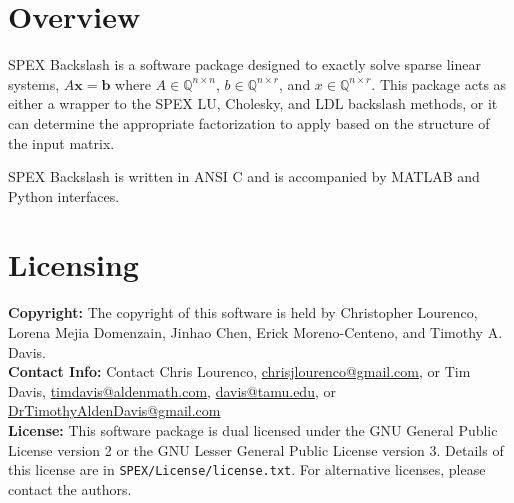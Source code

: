 \documentclass[12pt,oneside]{book}
\theoremstyle{definition}
\renewcommand{\b}{\mathbf{b}}
\newcommand{\x}{\mathbf{x}}
\begin{document}
\section{Overview} \label{s:Backslash:intro}
SPEX Backslash is a software package designed to exactly solve sparse
linear systems, $A \x = \b$ where $A \in \mathbb{Q}^{n \times
n}$, $b \in \mathbb{Q}^{n \times r}$, and $x \in \mathbb{Q}^{n \times
r}$. This package acts as either a wrapper to the SPEX LU, Cholesky, and LDL
backslash methods, or it can determine the appropriate factorization to apply based on the
structure of the input matrix.

SPEX Backslash is written in ANSI C and is accompanied by MATLAB and Python interfaces.

 
\section{Licensing} \label{s:Backslash:licensing}
\textbf{Copyright:} The copyright of this software is held by  Christopher Lourenco, Lorena Mejia Domenzain, Jinhao Chen, Erick Moreno-Centeno, and Timothy A. Davis.\\

\noindent \textbf{Contact Info:} Contact Chris Lourenco,
\href{mailto:chrisjlourenco@gmail.com}{chrisjlourenco@gmail.com}, or Tim Davis,
\href{mailto:timdavis@aldenmath.com}{timdavis@aldenmath.com},
\href{mailto:davis@tamu.edu}{davis@tamu.edu}, or
\href{DrTimothyAldenDavis@gmail.com}{DrTimothyAldenDavis@gmail.com}\\

\noindent \textbf{License:} This software package is dual licensed under the GNU General Public License version 2 or the GNU Lesser General Public License version 3. Details of this license are in \verb|SPEX/License/license.txt|. For alternative licenses, please contact the authors.

\newpage
\end{document}
